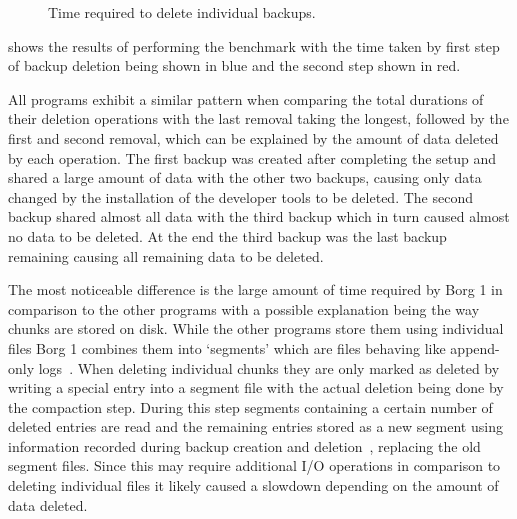 \begin{figure}[H]
    \caption{Time required to delete individual backups.}\label{fig:vm-images}
\end{figure}

 shows the results of performing the benchmark with the time
taken by first step of backup deletion being shown in blue and the second step
shown in red.

All programs exhibit a similar pattern when comparing the total durations of their
deletion operations with the last removal taking the longest, followed by the first
and second removal, which can be explained by the amount of data deleted by each
operation.
The first backup was created after completing the setup and shared a large amount
of data with the other two backups, causing only data changed by the installation
of the developer tools to be deleted.
The second backup shared almost all data with the third backup which in turn
caused almost no data to be deleted.
At the end the third backup was the last backup remaining causing all remaining
data to be deleted.

The most noticeable difference is the large amount of time required by Borg 1
in comparison to the other programs with a possible explanation being the way
chunks are stored on disk.
While the other programs store them using individual files Borg 1 combines them
into `segments' which are files behaving like append-only logs~\cite[section `Internals']{Borg1}.
When deleting individual chunks they are only marked as deleted by writing
a special entry into a segment file with the actual deletion being done by
the compaction step.
During this step segments containing a certain number of deleted entries are
read and the remaining entries stored as a new segment using information recorded
during backup creation and deletion~\cite[section `Internals']{Borg1}, replacing
the old segment files.
Since this may require additional I/O operations in comparison to deleting individual
files it likely caused a slowdown depending on the amount of data deleted.

